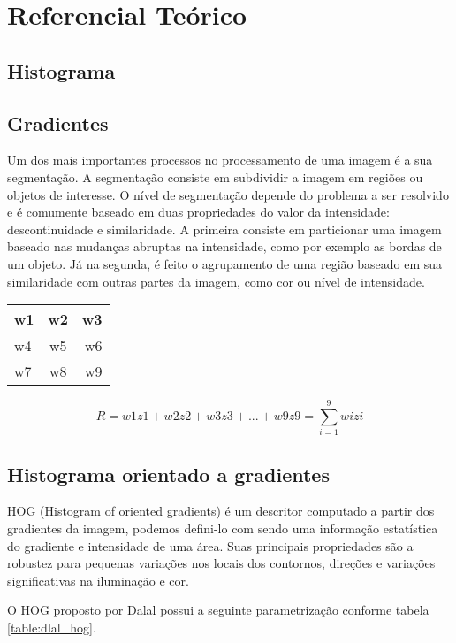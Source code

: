 \chapter{Referencial Teórico}

\section{Histograma}

\section{Gradientes}

Um dos mais importantes processos no processamento de uma imagem é a sua segmentação. A segmentação consiste em subdividir a imagem em regiões ou objetos de interesse. O nível de segmentação depende do problema a ser resolvido e é comumente baseado em duas propriedades do valor da intensidade: descontinuidade e similaridade. A primeira consiste em particionar uma imagem baseado nas mudanças abruptas na intensidade, como por exemplo as bordas de um objeto. Já na segunda, é feito o agrupamento de uma região baseado em sua similaridade com outras partes da imagem, como cor ou nível de intensidade.

\begin{center}
\begin{tabular}{| l |c | r |}
\hline
w1 & w2 & w3 \\ \hline
w4 & w5 & w6 \\ \hline
w7 & w8 & w9 \\ \hline
\end{tabular}
\end{center}

\[R = w1z1 + w2z2 + w3z3 + ... +w9z9 = \sum_{i=1}^{9}{wizi}\]

\section{Histograma orientado a gradientes}

HOG (Histogram of oriented gradients) é um descritor computado a partir dos gradientes da imagem, podemos defini-lo com sendo uma informação estatística do gradiente e intensidade de uma área. Suas principais propriedades são a robustez para pequenas variações nos locais dos contornos, direções e variações significativas na iluminação e cor.

O HOG proposto por Dalal \cite{dalal} possui a seguinte parametrização conforme tabela \ref{table:dlal_hog}.

